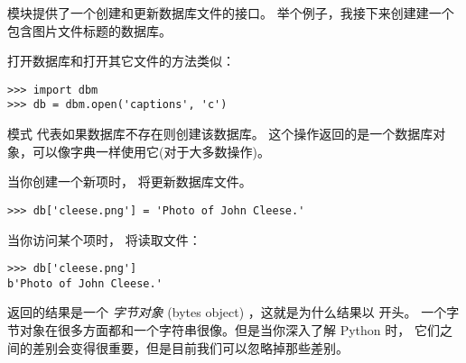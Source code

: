 {{{{{{{ 模块提供了一个创建和更新数据库文件的接口。
举个例子，我接下来创建建一个包含图片文件标题的数据库。

  


打开数据库和打开其它文件的方法类似：

\begin{lstlisting}
>>> import dbm
>>> db = dbm.open('captions', 'c')
\end{lstlisting}

%

模式  代表如果数据库不存在则创建该数据库。
这个操作返回的是一个数据库对象，可以像字典一样使用它(对于大多数操作)。

  


当你创建一个新项时， 将更新数据库文件。


\begin{lstlisting}
>>> db['cleese.png'] = 'Photo of John Cleese.'
\end{lstlisting}

%

当你访问某个项时， 将读取文件：

\begin{lstlisting}
>>> db['cleese.png']
b'Photo of John Cleese.'
\end{lstlisting}

%

返回的结果是一个 {\em 字节对象} (bytes object) ，这就是为什么结果以  开头。
一个字节对象在很多方面都和一个字符串很像。但是当你深入了解 Python 时，
它们之间的差别会变得很重要，但是目前我们可以忽略掉那些差别。

  


}}}}}}}
